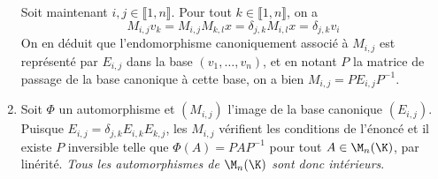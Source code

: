 \begin{enonce}
\begin{solution}
\begin{enumerate}[\bfseries a)]
    Soit maintenant $i,j\in\llbracket 1,n\rrbracket$.
    Pour tout $k\in\llbracket 1,n\rrbracket$, on a
    \[M_{i,j}v_k=M_{i,j}M_{k,l}x=\delta_{j,k}M_{i,l}x
      =\delta_{j,k}v_i\]
    On en déduit que l'endomorphisme canoniquement associé à
    $M_{i,j}$ est représenté par $E_{i,j}$ dans la base
    $(v_1,\ldots,v_n)$, et en notant $P$ la matrice de passage de la
    base canonique à cette base, on a bien $M_{i,j}=PE_{i,j}P^{-1}$.
  \item Soit $\Phi$ un automorphisme et $(M_{i,j})$ l'image de la base
    canonique $(E_{i,j})$. Puisque
    $E_{i,j}=\delta_{j,k}E_{i,k}E_{k,j}$, les $M_{i,j}$ vérifient les
    conditions de l'énoncé et il existe $P$ inversible telle que
    $\Phi(A)=PAP^{-1}$ pour tout $A\in\M_n(\K)$, par
    linérité. {\itshape Tous
    les automorphismes de $\M_n(\K)$ sont donc intérieurs}.
  \end{enumerate}
\end{solution}
\end{enonce}